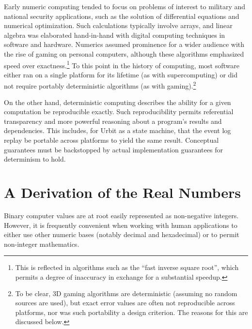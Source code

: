 \documentclass[twoside]{article}
\begin{document}
\sloppy
Early numeric computing tended to focus on problems of interest to military and national security applications, such as the solution of differential equations and numerical optimization.  Such calculations typically involve arrays, and linear algebra was elaborated hand-in-hand with digital computing techniques in software and hardware.  Numerics assumed prominence for a wider audience with the rise of gaming on personal computers, although these algorithms emphasized speed over exactness.\footnote{This is reflected in algorithms such as the “fast inverse square root”, which permits a degree of inaccuracy in exchange for a substantial speedup.}  To this point in the history of computing, most software either ran on a single platform for its lifetime (as with supercomputing) or did not require portably deterministic algorithms (as with gaming).\footnote{To be clear, 3D gaming algorithms are deterministic (assuming no random sources are used), but exact error values are often not reproducible across platforms, nor was such portability a design criterion.  The reasons for this are discussed below.}

On the other hand, deterministic computing describes the ability for a given computation be reproducible exactly.  Such reproducibility permits referential transparency and more powerful reasoning about a program's results and dependencies.  This includes, for Urbit as a state machine, that the event log replay be portable across platforms to yield the same result.  Conceptual guarantees must be backstopped by actual implementation guarantees for determinism to hold.

\section{A Derivation of the Real Numbers}

\sloppy
Binary computer values are at root easily represented as non-negative integers.  However, it is frequently convenient when working with human applications to either use other numeric bases (notably decimal and hexadecimal) or to permit non-integer mathematics.
\end{document}
